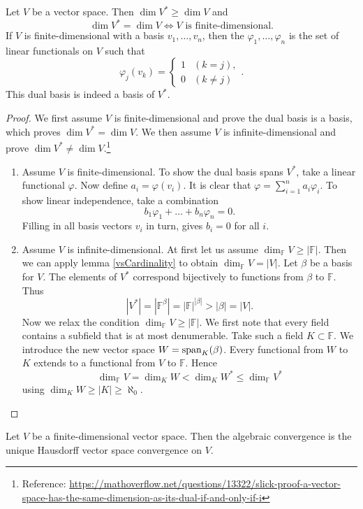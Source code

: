 \begin{proposition} \label{dualBasisDimension}
Let $V$ be a vector space. Then $\dim V^* \geq \dim V$ and
\[ \dim V^* = \dim V \iff \text{$V$ is finite-dimensional}. \]
If $V$ is finite-dimensional with a basis $v_1, \ldots, v_n$, then the  $\varphi_1, \ldots, \varphi_n$ is the set of linear functionals on $V$ such that
\[ \varphi_j(v_k) = \begin{cases}
1 & (k=j), \\ 0 & (k\neq j)
\end{cases}. \]
This dual basis is indeed a basis of $V^*$.
\end{proposition}
\begin{proof}
We first assume $V$ is finite-dimensional and prove the dual basis is a basis, which proves $\dim V^* = \dim V$. We then assume $V$ is infinite-dimensional and prove $\dim V^* \neq \dim V$.\footnote{Reference: \url{https://mathoverflow.net/questions/13322/slick-proof-a-vector-space-has-the-same-dimension-as-its-dual-if-and-only-if-i}}
\begin{enumerate}
\item Assume $V$ is finite-dimensional. To show the dual basis spans $V^*$, take a linear functional $\varphi$. Now define $a_i = \varphi(v_i)$. It is clear that $\varphi = \sum_{i=1}^n a_i\varphi_i$. To show linear independence, take a combination
\[ b_1\varphi_1 + \ldots +b_n\varphi_n =0. \]
Filling in all basis vectors $v_i$ in turn, gives $b_i=0$ for all $i$.
\item Assume $V$ is infinite-dimensional. At first let us assume $\dim_{\mathbb{F}}V \geq |\mathbb{F}|$. Then we can apply lemma \ref{vsCardinality} to obtain $\dim_{\mathbb{F}}V = |V|$. Let $\beta$ be a basis for $V$. The elements of $V^*$ correspond bijectively to functions from $\beta$ to $\mathbb{F}$. Thus
\[ |V^*| = |\mathbb{F}^\beta| = |\mathbb{F}|^{|\beta|} > |\beta| = |V|. \]
Now we relax the condition $\dim_{\mathbb{F}}V \geq |\mathbb{F}|$. We first note that every field contains a subfield that is at most denumerable. Take such a field $K\subset \mathbb{F}$. We introduce the new vector space $W = \operatorname{span}_K(\beta)$. Every functional from $W$ to $K$ extends to a functional from $V$ to $\mathbb{F}$. Hence
\[ \dim_\mathbb{F} V = \dim_K W < \dim_K W^* \leq \dim_{\mathbb{F}} V^* \]
using $\dim_{K}W \geq |K| \geq \aleph_0$.
\end{enumerate}
\end{proof}
\begin{corollary}
Let $V$ be a finite-dimensional vector space. Then the algebraic convergence is the unique Hausdorff vector space convergence on $V$.
\end{corollary}
